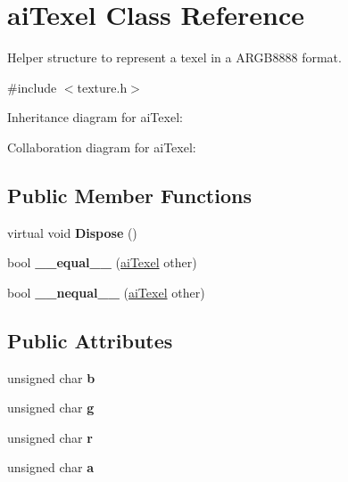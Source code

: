 \hypertarget{structai_texel}{\section{ai\+Texel Class Reference}
\label{structai_texel}
}


Helper structure to represent a texel in a A\+R\+G\+B8888 format.  




{\ttfamily \#include $<$texture.\+h$>$}



Inheritance diagram for ai\+Texel\+:


Collaboration diagram for ai\+Texel\+:
\subsection*{Public Member Functions}
\begin{DoxyCompactItemize}
\item 
\hypertarget{structai_texel_af3e3632977506b62cab03d0b1a840391}{virtual void {\bfseries Dispose} ()}\label{structai_texel_af3e3632977506b62cab03d0b1a840391}

\item 
\hypertarget{structai_texel_a9ff535d14ae7d37c7ccfe8575bed9623}{bool {\bfseries \+\_\+\+\_\+equal\+\_\+\+\_\+} (\hyperlink{structai_texel}{ai\+Texel} other)}\label{structai_texel_a9ff535d14ae7d37c7ccfe8575bed9623}

\item 
\hypertarget{structai_texel_a65928f4ef094c3b79007fbeeb6e189ad}{bool {\bfseries \+\_\+\+\_\+nequal\+\_\+\+\_\+} (\hyperlink{structai_texel}{ai\+Texel} other)}\label{structai_texel_a65928f4ef094c3b79007fbeeb6e189ad}

\end{DoxyCompactItemize}
\subsection*{Public Attributes}
\begin{DoxyCompactItemize}
\item 
\hypertarget{structai_texel_a5b4f97f69cf59cb9065af67389599ba6}{unsigned char {\bfseries b}}\label{structai_texel_a5b4f97f69cf59cb9065af67389599ba6}

\item 
\hypertarget{structai_texel_a41da3516b8241165e4ca58ea8ed68fe6}{unsigned char {\bfseries g}}\label{structai_texel_a41da3516b8241165e4ca58ea8ed68fe6}

\item 
\hypertarget{structai_texel_ae9408c0d18f6ff597715cc626398a0ff}{unsigned char {\bfseries r}}\label{structai_texel_ae9408c0d18f6ff597715cc626398a0ff}

\item 
\hypertarget{structai_texel_a6d4450e83b02b29d24f7aab27958034e}{unsigned char {\bfseries a}}\label{structai_texel_a6d4450e83b02b29d24f7aab27958034e}

\end{DoxyCompactItemize}
